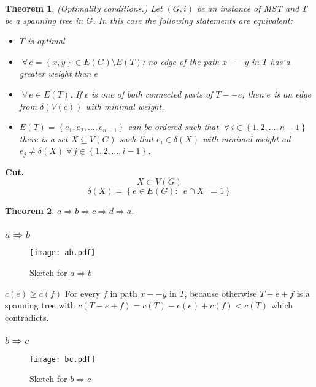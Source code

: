 \documentclass{article}
\newtheorem{theorem}{Theorem}
\newcommand{\card}[1]{\left|\:\!#1\:\!\right|}
\newcommand{\set}[1]{\left\{#1\right\}}
\newcommand{\fall}{\;\forall\,}
\begin{document}
\begin{theorem}\label{satz-2.2}
(Optimality conditions.)
Let $(G, i)$ be an instance of MST and $T$ be a spanning tree in $G$. In this case the following statements are equivalent:
\begin{itemize}
  \item $T$ is optimal
  \item $\fall e = \set{x, y} \in E(G) \setminus E(T)$: no edge of the path $x--y$ in $T$ has a greater weight than $e$
  \item $\fall e \in E(T)$: If $c$ is one of both connected parts of $T--e$, then $e$ is an edge from $\delta(V(c))$ with minimal weight.
  \item $E(T) = \set{e_1, e_2, \ldots, e_{n-1}}$ can be ordered such that $\fall i \in \set{1, 2, \ldots, n-1}$ there is a set $X \subseteq V(G)$ such that $e_i \in \delta(X)$ with minimal weight ad $e_j \neq \delta(X) \fall j \in \set{1, 2, \ldots, i-1}$.
\end{itemize}
\end{theorem}

\textbf{Cut.}
\[
  X \subset V(G)
\] \[
  \delta(X) = \set{e \in E(G): \card{e \cap X} = 1}
\]

\begin{theorem}
  $a \Rightarrow b \Rightarrow c \Rightarrow d \Rightarrow a$.
\end{theorem}

\subsubsection{$a \Rightarrow b$}
%
\begin{figure}[t]
  \begin{center}
    \texttt{[image: ab.pdf]}
    \caption{Sketch for $a \Rightarrow b$}
  \end{center}
\end{figure}

$c(e) \geq c(f)$
For every $f$ in path $x--y$ in $T$, because otherwise $T - e + f$ is a spanning tree with $c(T - e  + f) = c(T) - c(e) + c(f) < c(T)$ which contradicts.

\subsubsection{$b \Rightarrow c$}
%
\begin{figure}[t]
  \begin{center}
    \texttt{[image: bc.pdf]}
    \caption{Sketch for $b \Rightarrow c$}
  \end{center}
\end{figure}
\end{document}
